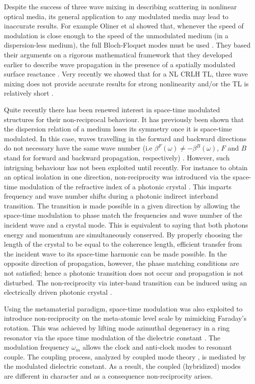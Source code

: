 \documentclass[journal]{IEEEtran}
\begin{document}
Despite the success of three wave mixing in describing scattering in nonlinear optical media, its general application to any modulated media may lead to inaccurate results. For example Oliner et al showed that, whenever the speed of modulation is close enough to the speed of the unmodulated medium (in a dispersion-less medium), the full Bloch-Floquet modes must be used \cite{Oliner1961}. They based their arguments on a rigorous mathematical framework that they developed earlier to describe wave propagation in the presence of a spatially modulated surface reactance \cite{Oliner1959}. Very recently we showed that for a NL CRLH TL, three wave mixing does not provide accurate results for strong nonlinearity and/or the TL is relatively short \cite{Sameh_TAP_TWM}.

Quite recently there has been renewed interest in space-time modulated structures for their non-reciprocal behaviour. It has previously been shown that the dispersion relation of a medium loses its symmetry once it is space-time modulated. In this case, waves travelling in the forward and backward directions do not necessary have the same wave number (i.e $\beta^F(\omega)\neq-\beta^B(\omega)$, $F$ and $B$ stand for forward and backward propagation, respectively) \cite{Cassedy1963}. However, such intriguing behaviour has not been exploited until recently. For instance to obtain an optical isolation in one direction, non-reciprocity was introduced via the space-time modulation of the refractive index of a photonic crystal \cite{Fan2009}. This imparts frequency and wave number shifts during a photonic indirect interband transition. The transition is made possible in a given direction by allowing the space-time modulation to phase match the frequencies and wave number of the incident wave and a crystal mode.  This is equivalent to saying that both photons energy and momentum are simultaneously conserved. By properly choosing the length of the crystal to be equal to the coherence length, efficient transfer from the incident wave to its space-time harmonic can be made possible. In the opposite direction of propagation, however, the phase matching conditions are not satisfied; hence a photonic transition does not occur and propagation is not disturbed. The non-reciprocity via inter-band transition can be induced using an electrically driven photonic crystal \cite{Lira2012}.

Using the metamaterial paradigm, space-time modulation was also exploited to introduce non-reciprocity on the meta-atomic level scale by mimicking Faraday's rotation. This was achieved by lifting mode azimuthal degeneracy in a ring resonator via the space time modulation of the dielectric constant \cite{AluCaloz}. The modulation frequency $\omega_m$ allows the clock and anti-clock modes to resonant couple. The coupling process, analyzed by coupled mode theory \cite{Winn1999}, is mediated by the modulated dielectric constant. As a result, the coupled (hybridized) modes are different in character and as a consequence non-reciprocity arises.
 
\end{document}
